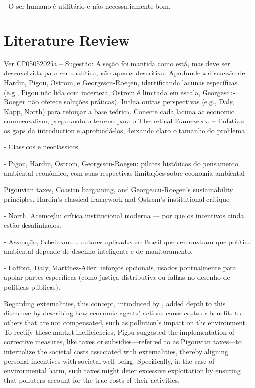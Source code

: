 - O ser humano é utilitário e não necessariamente bom.


\section{Literature Review}
Ver CP05052025a
-- Sugestão: A seção foi mantida como está, mas deve ser desenvolvida para ser analítica, não apenas descritiva. Aprofunde a discussão de Hardin, Pigou, Ostrom, e Georgescu-Roegen, identificando lacunas específicas (e.g., Pigou não lida com incerteza, Ostrom é limitada em escala, Georgescu-Roegen não oferece soluções práticas). Inclua outras perspectivas (e.g., Daly, Kapp, North) para reforçar a base teórica. Conecte cada lacuna ao economic commensalism, preparando o terreno para o Theoretical Framework.
-- Enfatizar os gaps da introduction e aprofundá-los, deixando claro o tamanho do problema

- Clássicos e neoclássicos

- Pigou, Hardin, Ostrom, Georgescu-Roegen: pilares históricos do pensamento ambiental econômico, com suas respectivas limitações sobre economia ambiental

Pigouvian taxes, Coasian bargaining, and Georgescu-Roegen’s sustainability principles.
Hardin’s classical framework and Ostrom’s institutional critique.

- North, Acemoglu: crítica institucional moderna — por que os incentivos ainda estão desalinhados.

- Assunção, Scheinkman: autores aplicados ao Brasil que demonstram que política ambiental depende de desenho inteligente e de monitoramento.

- Laffont, Daly, Martínez-Alier: reforços opcionais, usados pontualmente para apoiar partes específicas (como justiça distributiva ou falhas no desenho de políticas públicas).

Regarding externalities, this concept, introduced by , added depth to this discourse by describing how economic agents' actions cause costs or benefits to others that are not compensated, such as pollution's impact on the environment. To rectify these market inefficiencies, Pigou suggested the implementation of corrective measures, like taxes or subsidies—referred to as Pigouvian taxes—to internalize the societal costs associated with externalities, thereby aligning personal incentives with societal well-being. Specifically, in the case of environmental harm, such taxes might deter excessive exploitation by ensuring that polluters account for the true costs of their activities.

